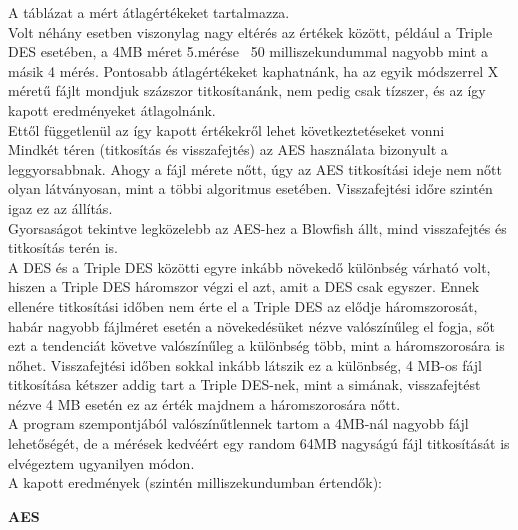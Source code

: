 \noindent A táblázat a mért átlagértékeket tartalmazza.
\vspace{5pt}\\Volt néhány esetben viszonylag nagy eltérés az értékek között, például a Triple DES esetében, a 4MB méret 5.mérése ~50 milliszekundummal nagyobb mint a másik 4 mérés. Pontosabb átlagértékeket kaphatnánk, ha az egyik módszerrel X méretű fájlt mondjuk százszor titkosítanánk, nem pedig csak tízszer, és az így kapott eredményeket átlagolnánk.
\vspace{5pt}\\Ettől függetlenül az így kapott értékekről lehet következtetéseket vonni
\vspace{5pt}\\Mindkét téren (titkosítás és visszafejtés) az AES használata bizonyult a leggyorsabbnak. Ahogy a fájl mérete nőtt, úgy az AES titkosítási ideje nem nőtt olyan látványosan, mint a többi algoritmus esetében. Visszafejtési időre szintén igaz ez az állítás. 
\vspace{5pt}\\Gyorsaságot tekintve legközelebb az AES-hez a Blowfish állt, mind visszafejtés és titkosítás terén is.
\vspace{5pt}\\A DES és a Triple DES közötti egyre inkább növekedő különbség várható volt, hiszen a Triple DES háromszor végzi el azt, amit a DES csak egyszer. Ennek ellenére titkosítási időben nem érte el a Triple DES az elődje háromszorosát, habár nagyobb fájlméret esetén a növekedésüket nézve valószínűleg el fogja, sőt ezt a tendenciát követve valószínűleg a különbség több, mint a háromszorosára is nőhet. Visszafejtési időben sokkal inkább látszik ez a különbség, 4 MB-os fájl titkosítása kétszer addig tart a Triple DES-nek, mint a simának, visszafejtést nézve 4 MB esetén ez az érték majdnem a háromszorosára nőtt.
\vspace{5pt}\\A program szempontjából valószínűtlennek tartom a 4MB-nál nagyobb fájl lehetőségét, de a mérések kedvéért egy random 64MB nagyságú fájl titkosítását is elvégeztem ugyanilyen módon. 
\vspace{5pt}\\A kapott eredmények (szintén milliszekundumban értendők):

\newpage \noindent \textbf{AES}

